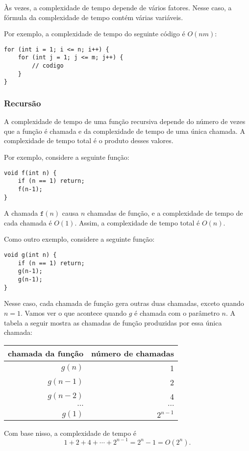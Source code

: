Às vezes, a complexidade de tempo depende de
vários fatores.
Nesse caso, a fórmula da complexidade de tempo
contém várias variáveis.

Por exemplo, a complexidade de tempo do
seguinte código é $O(nm)$:

\begin{lstlisting}
for (int i = 1; i <= n; i++) {
    for (int j = 1; j <= m; j++) {
        // codigo
    }
}
\end{lstlisting}

\subsubsection*{Recursão}

A complexidade de tempo de uma função recursiva
depende do número de vezes que a função é chamada
e da complexidade de tempo de uma única chamada.
A complexidade de tempo total é o produto desses valores.

Por exemplo, considere a seguinte função:
\begin{lstlisting}
void f(int n) {
    if (n == 1) return;
    f(n-1);
}
\end{lstlisting}
A chamada $\texttt{f}(n)$ causa $n$ chamadas de função,
e a complexidade de tempo de cada chamada é $O(1)$.
Assim, a complexidade de tempo total é $O(n)$.

Como outro exemplo, considere a seguinte função:
\begin{lstlisting}
void g(int n) {
    if (n == 1) return;
    g(n-1);
    g(n-1);
}
\end{lstlisting}
Nesse caso, cada chamada de função gera outras duas chamadas,
exceto quando $n=1$.
Vamos ver o que acontece quando $g$ é chamada 
com o parâmetro $n$.
A tabela a seguir mostra as chamadas de função
produzidas por essa única chamada:
\begin{center}
\begin{tabular}{rr}
chamada da função & número de chamadas \\
\hline
$g(n)$ & 1 \\
$g(n-1)$ & 2 \\
$g(n-2)$ & 4 \\
$\cdots$ & $\cdots$ \\
$g(1)$ & $2^{n-1}$ \\
\end{tabular}
\end{center}
Com base nisso, a complexidade de tempo é
\[1+2+4+\cdots+2^{n-1} = 2^n-1 = O(2^n).\]

